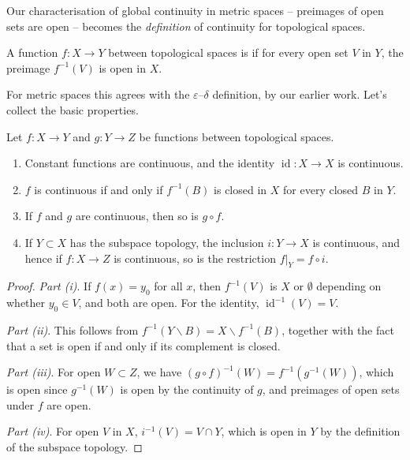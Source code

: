 Our characterisation of global continuity in metric spaces -- preimages of open sets are open -- becomes the \emph{definition} of continuity for topological spaces.

\begin{definition}[Continuity]
    A function $f: X \rightarrow Y$ between topological spaces is  if for every open set $V$ in $Y$, the preimage $f^{-1}(V)$ is open in $X$.
\end{definition}

For metric spaces this agrees with the $\varepsilon$--$\delta$ definition, by our earlier work. Let's collect the basic properties.

\begin{proposition}
    Let $f: X \rightarrow Y$ and $g: Y \rightarrow Z$ be functions between topological spaces.
    \begin{enumerate}[label=(\roman*)]
        \item Constant functions are continuous, and the identity $\operatorname{id}: X \rightarrow X$ is continuous.
        \item $f$ is continuous if and only if $f^{-1}(B)$ is closed in $X$ for every closed $B$ in $Y$.
        \item If $f$ and $g$ are continuous, then so is $g \circ f$.
        \item If $Y \subset X$ has the subspace topology, the inclusion $i: Y \rightarrow X$ is continuous, and hence if $f: X \rightarrow Z$ is continuous, so is the restriction $f|_Y = f \circ i$.
    \end{enumerate}
\end{proposition}
\begin{proof}
    \emph{Part (i)}. If $f(x) = y_0$ for all $x$, then $f^{-1}(V)$ is $X$ or $\emptyset$ depending on whether $y_0 \in V$, and both are open. For the identity, $\operatorname{id}^{-1}(V) = V$.

    \emph{Part (ii)}. This follows from $f^{-1}(Y \backslash B) = X \backslash f^{-1}(B)$, together with the fact that a set is open if and only if its complement is closed.

    \emph{Part (iii)}. For open $W \subset Z$, we have $(g \circ f)^{-1}(W) = f^{-1}(g^{-1}(W))$, which is open since $g^{-1}(W)$ is open by the continuity of $g$, and preimages of open sets under $f$ are open.

    \emph{Part (iv)}. For open $V$ in $X$, $i^{-1}(V) = V \cap Y$, which is open in $Y$ by the definition of the subspace topology.
\end{proof}

